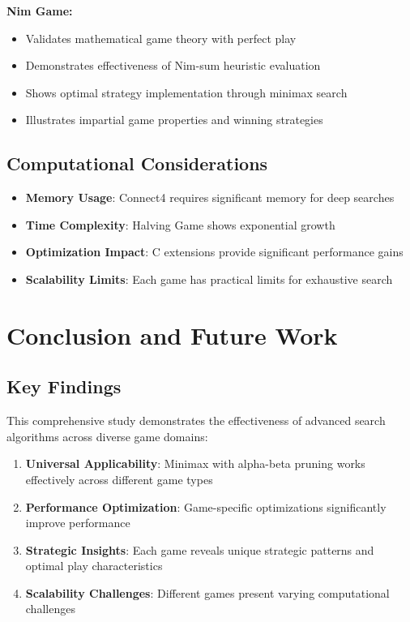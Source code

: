 \documentclass[12pt]{article}
\begin{document}
\textbf{Nim Game:}
\begin{itemize}
    \item Validates mathematical game theory with perfect play
    \item Demonstrates effectiveness of Nim-sum heuristic evaluation
    \item Shows optimal strategy implementation through minimax search
    \item Illustrates impartial game properties and winning strategies
\end{itemize}

\subsection{Computational Considerations}

\begin{itemize}
    \item \textbf{Memory Usage}: Connect4 requires significant memory for deep searches
    \item \textbf{Time Complexity}: Halving Game shows exponential growth
    \item \textbf{Optimization Impact}: C extensions provide significant performance gains
    \item \textbf{Scalability Limits}: Each game has practical limits for exhaustive search
\end{itemize}

\section{Conclusion and Future Work}

\subsection{Key Findings}

This comprehensive study demonstrates the effectiveness of advanced search algorithms across diverse game domains:

\begin{enumerate}
    \item \textbf{Universal Applicability}: Minimax with alpha-beta pruning works effectively across different game types
    \item \textbf{Performance Optimization}: Game-specific optimizations significantly improve performance
    \item \textbf{Strategic Insights}: Each game reveals unique strategic patterns and optimal play characteristics
    \item \textbf{Scalability Challenges}: Different games present varying computational challenges
\end{enumerate}
\end{document}
